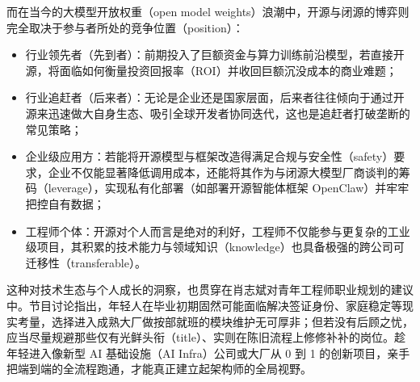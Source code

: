 \documentclass[UTF8,a4paper,11pt,fontset=fandol]{ctexart}
\begin{document}
而在当今的大模型开放权重（open model weights）浪潮中，开源与闭源的博弈则完全取决于参与者所处的竞争位置（position）：
\begin{itemize}
\item 行业领先者（先到者）：前期投入了巨额资金与算力训练前沿模型，若直接开源，将面临如何衡量投资回报率（ROI）并收回巨额沉没成本的商业难题；
\item 行业追赶者（后来者）：无论是企业还是国家层面，后来者往往倾向于通过开源来迅速做大自身生态、吸引全球开发者协同迭代，这也是追赶者打破垄断的常见策略；
\item 企业级应用方：若能将开源模型与框架改造得满足合规与安全性（safety）要求，企业不仅能显著降低调用成本，还能将其作为与闭源大模型厂商谈判的筹码（leverage），实现私有化部署（如部署开源智能体框架 OpenClaw）并牢牢把控自有数据；
\item 工程师个体：开源对个人而言是绝对的利好，工程师不仅能参与更复杂的工业级项目，其积累的技术能力与领域知识（knowledge）也具备极强的跨公司可迁移性（transferable）。
\end{itemize}

这种对技术生态与个人成长的洞察，也贯穿在肖志斌对青年工程师职业规划的建议中。节目讨论指出，年轻人在毕业初期固然可能面临解决签证身份、家庭稳定等现实考量，选择进入成熟大厂做按部就班的模块维护无可厚非；但若没有后顾之忧，应当尽量规避那些仅有光鲜头衔（title）、实则在陈旧流程上修修补补的岗位。趁年轻进入像新型 AI 基础设施（AI Infra）公司或大厂从 0 到 1 的创新项目，亲手把端到端的全流程跑通，才能真正建立起架构师的全局视野。
\end{document}
